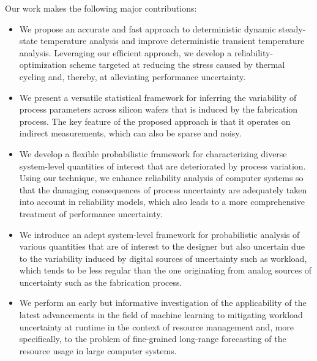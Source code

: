Our work makes the following major contributions:

\begin{itemize}

\item
We propose an accurate and fast approach to deterministic dynamic steady-state
temperature analysis and improve deterministic transient temperature analysis.
Leveraging our efficient approach, we develop a reliability-optimization scheme
targeted at reducing the stress caused by thermal cycling and, thereby, at
alleviating performance uncertainty.

\item
We present a versatile statistical framework for inferring the variability of
process parameters across silicon wafers that is induced by the fabrication
process. The key feature of the proposed approach is that it operates on
indirect measurements, which can also be sparse and noisy.

\item
We develop a flexible probabilistic framework for characterizing diverse
system-level quantities of interest that are deteriorated by process variation.
Using our technique, we enhance reliability analysis of computer systems so that
the damaging consequences of process uncertainty are adequately taken into
account in reliability models, which also leads to a more comprehensive
treatment of performance uncertainty.

\item
We introduce an adept system-level framework for probabilistic analysis of
various quantities that are of interest to the designer but also uncertain due
to the variability induced by digital sources of uncertainty such as workload,
which tends to be less regular than the one originating from analog sources of
uncertainty such as the fabrication process.

\item
We perform an early but informative investigation of the applicability of the
latest advancements in the field of machine learning to mitigating workload
uncertainty at runtime in the context of resource management and, more
specifically, to the problem of fine-grained long-range forecasting of the
resource usage in large computer systems.

\end{itemize}
